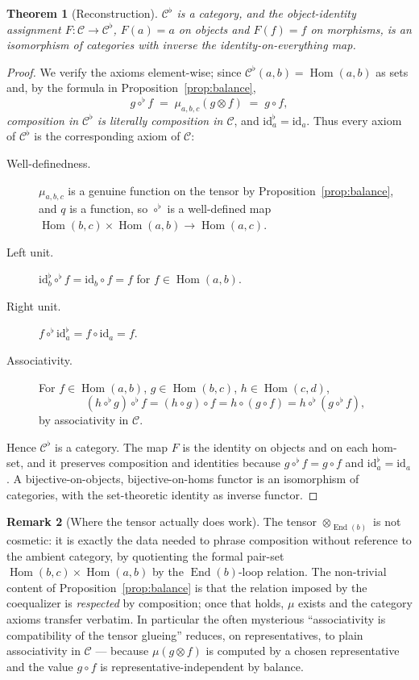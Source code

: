 \documentclass[11pt]{article}
\newtheorem{theorem}{Theorem}
\theoremstyle{definition}
\newtheorem{remark}[theorem]{Remark}
\newcommand{\Hom}{\operatorname{Hom}}
\newcommand{\End}{\operatorname{End}}
\newcommand{\id}{\mathrm{id}}
\newcommand{\C}{\mathcal{C}}
\begin{document}
\begin{theorem}[Reconstruction]\label{thm:reconstruct}
$\C^{\flat}$ is a category, and the object-identity assignment
$F:\C\to\C^{\flat}$, $F(a)=a$ on objects and $F(f)=f$ on morphisms, is an
isomorphism of categories with inverse the identity-on-everything map.
\end{theorem}

\begin{proof}
We verify the axioms element-wise; since
$\C^{\flat}(a,b)=\Hom(a,b)$ as sets and, by the formula in
Proposition~\ref{prop:balance},
\[
  g\circ^{\flat} f \;=\; \mu_{a,b,c}(g\otimes f) \;=\; g\circ f ,
\]
\emph{composition in $\C^{\flat}$ is literally composition in $\C$}, and
$\id^{\flat}_a=\id_a$. Thus every axiom of $\C^{\flat}$ is the corresponding
axiom of $\C$:
\begin{description}
\item[Well-definedness.] $\mu_{a,b,c}$ is a genuine function on the tensor by
Proposition~\ref{prop:balance}, and $q$ is a function, so $\circ^{\flat}$ is a
well-defined map $\Hom(b,c)\times\Hom(a,b)\to\Hom(a,c)$.
\item[Left unit.] $\id^{\flat}_b\circ^{\flat} f = \id_b\circ f = f$ for
$f\in\Hom(a,b)$.
\item[Right unit.] $f\circ^{\flat}\id^{\flat}_a = f\circ\id_a = f$.
\item[Associativity.] For $f\in\Hom(a,b)$, $g\in\Hom(b,c)$,
$h\in\Hom(c,d)$,
\[
  (h\circ^{\flat} g)\circ^{\flat} f = (h\circ g)\circ f
  = h\circ(g\circ f) = h\circ^{\flat}(g\circ^{\flat} f),
\]
by associativity in $\C$.
\end{description}
Hence $\C^{\flat}$ is a category. The map $F$ is the identity on objects and on
each hom-set, and it preserves composition and identities because
$g\circ^{\flat} f = g\circ f$ and $\id^{\flat}_a=\id_a$. A bijective-on-objects,
bijective-on-homs functor is an isomorphism of categories, with the
set-theoretic identity as inverse functor.
\end{proof}

\begin{remark}[Where the tensor actually does work]
The tensor $\otimes_{\End(b)}$ is not cosmetic: it is exactly the data needed
to phrase composition without reference to the ambient category, by quotienting
the formal pair-set $\Hom(b,c)\times\Hom(a,b)$ by the $\End(b)$-loop relation.
The non-trivial content of Proposition~\ref{prop:balance} is that the relation
imposed by the coequalizer is \emph{respected} by composition; once that holds,
$\mu$ exists and the category axioms transfer verbatim. In particular the often
mysterious ``associativity is compatibility of the tensor glueing'' reduces, on
representatives, to plain associativity in $\C$ --- because $\mu(g\otimes f)$ is
computed by a chosen representative and the value $g\circ f$ is
representative-independent by balance.
\end{remark}
\end{document}
